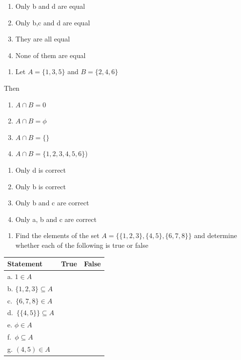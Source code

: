 \documentclass[]{book}
\providecommand{\tightlist}{%
  \setlength{\itemsep}{0pt}\setlength{\parskip}{0pt}}
\begin{document}
\begin{enumerate}
\def\labelenumi{\roman{enumi}.}
\tightlist
\item
  Only b and d are equal
\item
  Only b,c and d are equal
\item
  They are all equal
\item
  None of them are equal
\end{enumerate}

\begin{enumerate}
\def\labelenumi{\arabic{enumi}.}
\setcounter{enumi}{1}
\tightlist
\item
  Let \(A=\{1,3,5\}\) and \(B=\{2,4,6\}\)
\end{enumerate}

Then

\begin{enumerate}
\def\labelenumi{(\alph{enumi})}
\tightlist
\item
  \(A\cap B = 0\)
\item
  \(A\cap B = \phi\)
\item
  \(A\cap B = \{\}\)
\item
  \(A\cap B = \{1,2,3,4,5,6\}\))
\end{enumerate}

\begin{enumerate}
\def\labelenumi{\roman{enumi}.}
\tightlist
\item
  Only d is correct
\item
  Only b is correct
\item
  Only b and c are correct
\item
  Only a, b and c are correct
\end{enumerate}

\begin{enumerate}
\def\labelenumi{\arabic{enumi}.}
\setcounter{enumi}{2}
\tightlist
\item
  Find the elements of the set \(A=\{\{1,2,3\}, \{4,5\}, \{6,7,8\}\}\) and determine whether each of the following is true or false
\end{enumerate}

\begin{longtable}[]{@{}lll@{}}
\toprule
Statement & True & False\tabularnewline
\midrule
\endhead
a. \(1\in A\) & &\tabularnewline
b. \(\{1,2,3\}\subseteq A\) & &\tabularnewline
c.~\(\{6,7,8\}\in A\) & &\tabularnewline
d.~\(\{\{4,5\}\}\subseteq A\) & &\tabularnewline
e. \(\phi\in A\) & &\tabularnewline
f.~\(\phi\subseteq A\) & &\tabularnewline
g. \((4,5)\in A\) & &\tabularnewline
\bottomrule
\end{longtable}
\end{document}
